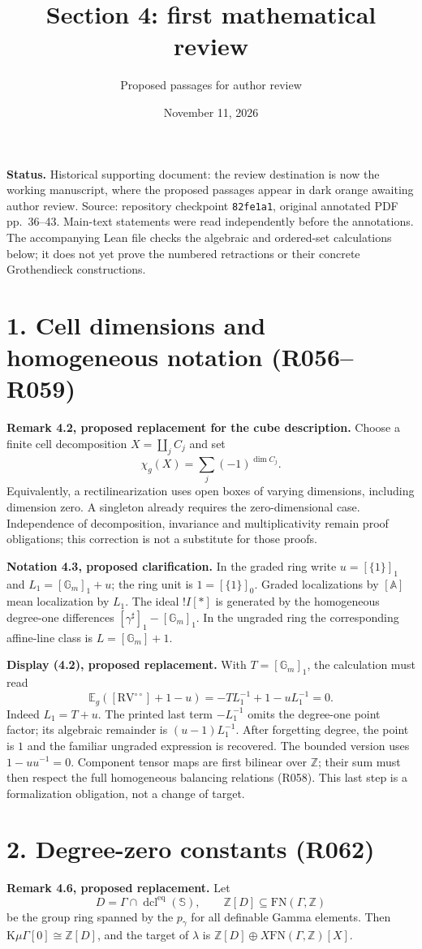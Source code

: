 \documentclass[11pt]{article}
\title{Section 4: first mathematical review}
\author{Proposed passages for author review}
\date{November 11, 2026}
\newcommand{\K}{\mathrm K}
\newcommand{\RV}{\mathrm{RV}}
\newcommand{\FN}{\mathrm{FN}}
\newcommand{\Gm}{\mathbb G_m}
\begin{document}
\maketitle
\noindent\textbf{Status.} Historical supporting document: the review destination
is now the working manuscript, where the proposed passages appear in dark
orange awaiting author review. Source: repository checkpoint \texttt{82fe1a1}, original annotated
PDF pp.~36--43. Main-text statements were read independently before the
annotations. The accompanying Lean file checks the algebraic and
ordered-set calculations below; it does not yet prove the numbered
retractions or their concrete Grothendieck constructions.

\section*{1. Cell dimensions and homogeneous notation (R056--R059)}
\textbf{Remark 4.2, proposed replacement for the cube description.}
Choose a finite cell decomposition $X=\coprod_j C_j$ and set
\[
  \chi_g(X)=\sum_j(-1)^{\dim C_j}.
\]
Equivalently, a rectilinearization uses open boxes of varying dimensions,
including dimension zero. A singleton already requires the zero-dimensional
case. Independence of decomposition, invariance and multiplicativity remain
proof obligations; this correction is not a substitute for those proofs.

\medskip\noindent\textbf{Notation 4.3, proposed clarification.}
In the graded ring write $u=[\{1\}]_1$ and
$L_1=[\Gm]_1+u$; the ring unit is $1=[\{1\}]_0$.
Graded localizations by $[\mathbb A]$ mean localization by $L_1$.
The ideal $!I[*]$ is generated by the homogeneous degree-one differences
$[\gamma^\sharp]_1-[\Gm]_1$. In the ungraded ring the corresponding
affine-line class is $L=[\Gm]+1$.

\medskip\noindent\textbf{Display (4.2), proposed replacement.}
With $T=[\Gm]_1$, the calculation must read
\[
 \mathbb E_g([\RV^{\circ\circ}]+1-u)
   =-T L_1^{-1}+1-uL_1^{-1}=0.
\]
Indeed $L_1=T+u$. The printed last term $-L_1^{-1}$ omits the
degree-one point factor; its algebraic remainder is $(u-1)L_1^{-1}$.
After forgetting degree, the point is $1$ and the familiar ungraded
expression is recovered. The bounded version uses
$1-u u^{-1}=0$. Component tensor maps are first bilinear over
$\mathbb Z$; their sum must then respect the full homogeneous balancing
relations (R058). This last step is a formalization obligation, not a
change of target.

\section*{2. Degree-zero constants (R062)}
\textbf{Remark 4.6, proposed replacement.}
Let
\[
 D=\Gamma\cap\operatorname{dcl}^{\mathrm{eq}}(\mathbb S),
 \qquad \mathbb Z[D]\subseteq\FN(\Gamma,\mathbb Z)
\]
be the group ring spanned by the $p_\gamma$ for all definable Gamma
elements. Then $\K\mu\Gamma[0]\cong\mathbb Z[D]$, and the target
of $\lambda$ is $\mathbb Z[D]\oplus X\FN(\Gamma,\mathbb Z)[X]$.
\end{document}
